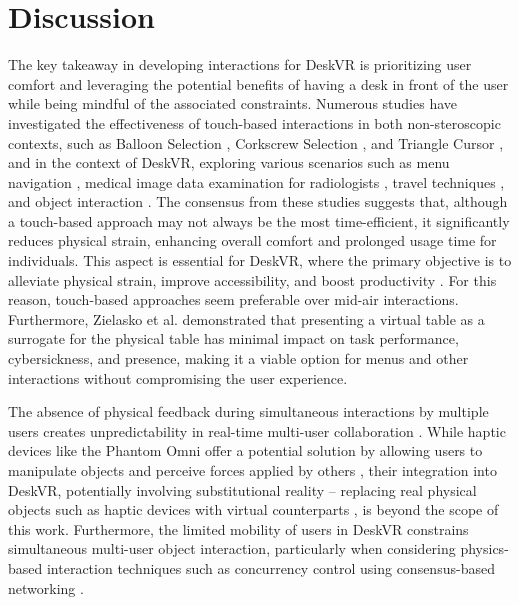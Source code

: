 \section{Discussion} \label{sec:sota_discussion}

    The key takeaway in developing interactions for DeskVR is prioritizing user comfort and leveraging the potential benefits of having a desk in front of the user while being mindful of the associated constraints. Numerous studies have investigated the effectiveness of touch-based interactions in both non-steroscopic contexts, such as Balloon Selection \cite{benkoBalloonSelectionMultiFinger2007}, Corkscrew Selection \cite{daiberBalloonSelectionRevisited2012}, and Triangle Cursor \cite{strothoffTriangleCursorInteractions2011}, and in the context of DeskVR, exploring various scenarios such as menu navigation \cite{zielaskoMenusDeskSystem2019}, medical image data examination for radiologists \cite{sousaVRRRRoomVirtualReality2017}, travel techniques \cite{amaroDesignEvaluationTravel2022}, and object interaction \cite{almeidaSIT6IndirectTouchbased2023}. The consensus from these studies suggests that, although a touch-based approach may not always be the most time-efficient, it significantly reduces physical strain, enhancing overall comfort and prolonged usage time for individuals. This aspect is essential for DeskVR, where the primary objective is to alleviate physical strain, improve accessibility, and boost productivity \cite{zielaskoRemainSeatedFullyimmersive2017, zielaskoSitNotSit2021}. For this reason, touch-based approaches seem preferable over mid-air interactions. Furthermore, Zielasko et al. \cite{zielaskoNonStationaryOfficeDesk2019} demonstrated that presenting a virtual table as a surrogate for the physical table has minimal impact on task performance, cybersickness, and presence, making it a viable option for menus and other interactions without compromising the user experience.
    
    The absence of physical feedback during simultaneous interactions by multiple users creates unpredictability in real-time multi-user collaboration \cite{ruddleLevelsControlCollaborative2003}. While haptic devices like the Phantom Omni \cite{silvaPHANToMOMNIHaptic2009} offer a potential solution by allowing users to manipulate objects and perceive forces applied by others \cite{ruddleSymmetricAsymmetricAction2002}, their integration into DeskVR, potentially involving substitutional reality -- replacing real physical objects such as haptic devices with virtual counterparts \cite{simeoneSubstitutionalRealityUsing2015}, is beyond the scope of this work. Furthermore, the limited mobility of users in DeskVR constrains simultaneous multi-user object interaction, particularly when considering physics-based interaction techniques such as concurrency control using consensus-based networking \cite{fristonConsensusBasedNetworking2022}.

